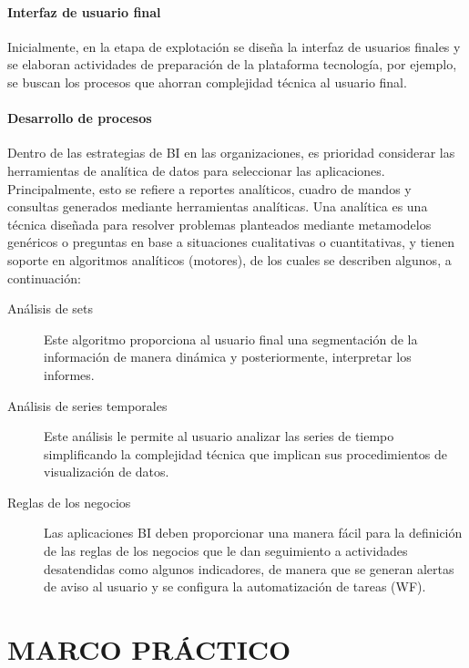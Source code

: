 \documentclass[11pt,titlepage]{report}
\begin{document}
\subsubsection{Interfaz de usuario final} 
Inicialmente, en la etapa de explotación se diseña la interfaz de usuarios finales y se elaboran actividades de preparación de la plataforma tecnología, por ejemplo, se buscan los procesos que ahorran complejidad técnica al usuario final.

\subsubsection{Desarrollo de procesos}
Dentro de las estrategias de BI en las organizaciones, es prioridad considerar las herramientas de analítica de datos para seleccionar las aplicaciones. Principalmente, esto se refiere a reportes analíticos, cuadro de mandos y consultas generados mediante herramientas analíticas. Una analítica es una técnica diseñada para resolver problemas planteados mediante metamodelos genéricos o preguntas en base a situaciones cualitativas o cuantitativas, y tienen soporte en algoritmos analíticos (motores), de los cuales se describen algunos, a continuación:

\begin{description}

\item[Análisis de sets]
Este algoritmo proporciona al usuario final una segmentación de la información de manera dinámica y posteriormente, interpretar los informes. 

\item[Análisis de series temporales] 
Este análisis le permite al usuario analizar las series de tiempo simplificando
la complejidad técnica que implican sus procedimientos de visualización de datos.

\item[Reglas de los negocios]
Las aplicaciones BI deben proporcionar una manera fácil para la definición de las reglas de los negocios que le dan seguimiento a actividades desatendidas como algunos indicadores, de manera que se generan alertas de aviso al usuario y se configura la automatización de tareas (WF).
\end{description}




\chapter{MARCO PRÁCTICO}
\end{document}
